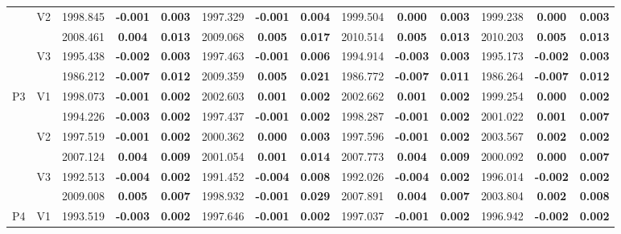 \documentclass[11pt,a4paper]{article}
\begin{document}
{\begin{sidewaystable}[H]
{\begin{tabular}{cc|ccc|ccc|ccc|ccc|}
   & \multirow{2}{*}{V2} & 1998.845 & \textbf{-0.001} & \textbf{0.003} & 1997.329 & \textbf{-0.001} & \textbf{0.004} & 1999.504 & \textbf{0.000} & \textbf{0.003} & 1999.238 & \textbf{0.000} & \textbf{0.003} \\ 
   &  & 2008.461 & \textbf{0.004} & \textbf{0.013} & 2009.068 & \textbf{0.005} & \textbf{0.017} & 2010.514 & \textbf{0.005} & \textbf{0.013} & 2010.203 & \textbf{0.005} & \textbf{0.013} \\ 
   & \multirow{2}{*}{V3} & 1995.438 & \textbf{-0.002} & \textbf{0.003} & 1997.463 & \textbf{-0.001} & \textbf{0.006} & 1994.914 & \textbf{-0.003} & \textbf{0.003} & 1995.173 & \textbf{-0.002} & \textbf{0.003} \\ 
   &  & 1986.212 & \textbf{-0.007} & \textbf{0.012} & 2009.359 & \textbf{0.005} & \textbf{0.021} & 1986.772 & \textbf{-0.007} & \textbf{0.011} & 1986.264 & \textbf{-0.007} & \textbf{0.012} \\ 
   \hline \hline\multirow{6}{*}{P3} & \multirow{2}{*}{V1} & 1998.073 & \textbf{-0.001} & \textbf{0.002} & 2002.603 & \textbf{0.001} & \textbf{0.002} & 2002.662 & \textbf{0.001} & \textbf{0.002} & 1999.254 & \textbf{0.000} & \textbf{0.002} \\ 
   &  & 1994.226 & \textbf{-0.003} & \textbf{0.002} & 1997.437 & \textbf{-0.001} & \textbf{0.002} & 1998.287 & \textbf{-0.001} & \textbf{0.002} & 2001.022 & \textbf{0.001} & \textbf{0.007} \\ 
   & \multirow{2}{*}{V2} & 1997.519 & \textbf{-0.001} & \textbf{0.002} & 2000.362 & \textbf{0.000} & \textbf{0.003} & 1997.596 & \textbf{-0.001} & \textbf{0.002} & 2003.567 & \textbf{0.002} & \textbf{0.002} \\ 
   &  & 2007.124 & \textbf{0.004} & \textbf{0.009} & 2001.054 & \textbf{0.001} & \textbf{0.014} & 2007.773 & \textbf{0.004} & \textbf{0.009} & 2000.092 & \textbf{0.000} & \textbf{0.007} \\ 
   & \multirow{2}{*}{V3} & 1992.513 & \textbf{-0.004} & \textbf{0.002} & 1991.452 & \textbf{-0.004} & \textbf{0.008} & 1992.026 & \textbf{-0.004} & \textbf{0.002} & 1996.014 & \textbf{-0.002} & \textbf{0.002} \\ 
   &  & 2009.008 & \textbf{0.005} & \textbf{0.007} & 1998.932 & \textbf{-0.001} & \textbf{0.029} & 2007.891 & \textbf{0.004} & \textbf{0.007} & 2003.804 & \textbf{0.002} & \textbf{0.008} \\ 
   \hline \hline\multirow{6}{*}{P4} & \multirow{2}{*}{V1} & 1993.519 & \textbf{-0.003} & \textbf{0.002} & 1997.646 & \textbf{-0.001} & \textbf{0.002} & 1997.037 & \textbf{-0.001} & \textbf{0.002} & 1996.942 & \textbf{-0.002} & \textbf{0.002} \\ 

\end{tabular}}
\end{sidewaystable}}
\end{document}
